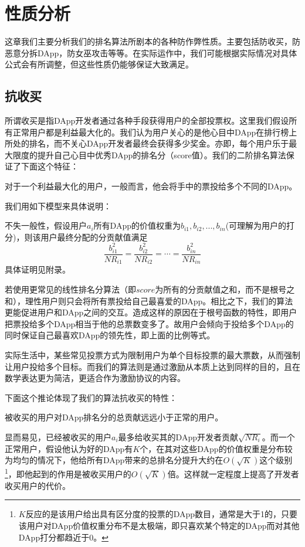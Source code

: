 \section{性质分析}
这章我们主要分析我们的排名算法所剧本的各种防作弊性质。主要包括防收买，防恶意分拆DApp，防女巫攻击等等。在实际运作中，我们可能根据实际情况对具体公式会有所调整，但这些性质仍能够保证大致满足。

\subsection{抗收买}
所谓收买是指DApp开发者通过各种手段获得用户的全部投票权。这里我们假设所有正常用户都是利益最大化的。我们认为用户关心的是他心目中DApp在排行榜上所处的排名，而不关心DApp开发者最终会获得多少奖金。亦即，每个用户乐于最大限度的提升自己心目中优秀DApp的排名分（score值）。我们的二阶排名算法保证了下面这个特征：

\begin{property}
	\label{p1}
	对于一个利益最大化的用户，一般而言，他会将手中的票投给多个不同的DApp。
\end{property}
我们用如下模型来具体说明：

不失一般性，假设用户$a_i$所有DApp的价值权重为$b_{i1},b_{i2},...,b_{in}$(可理解为用户的打分)，则该用户最终分配的分贡献值满足
$$\frac{b_{i1}^2}{NR_{i1}}=\frac{b_{i2}^2}{NR_{i2}}=\cdots=\frac{b_{in}^2}{NR_{in}}$$
具体证明见附录。

若使用更常见的线性排名分算法（即$score$为所有的分贡献值之和，而不是根号之和），理性用户则只会将所有票投给自己最喜爱的DApp。相比之下，我们的算法更能促进用户和DApp之间的交互。造成这样的原因在于根号函数的特性，即用户把票投给多个DApp相当于他的总票数变多了。故用户会倾向于投给多个DApp的同时保证自己最喜欢DApp的领先性，即上面的比例等式。

实际生活中，某些常见投票方式为限制用户为单个目标投票的最大票数，从而强制让用户投给多个目标。而我们的算法则是通过激励从本质上达到同样的目的，且在数学表达更为简洁，更适合作为激励协议的内容。

下面这个推论体现了我们的算法抗收买的特性：
\begin{corollary}
被收买的用户对DApp排名分的总贡献远远小于正常的用户。
\end{corollary}
显而易见，已经被收买的用户$a_i$最多给收买其的DApp开发者贡献$\sqrt{NR_i}$。而一个正常用户，假设他认为好的DApp有$K$个，在其对这些DApp的价值权重是分布较为均匀的情况下，他给所有DApp带来的总排名分提升大约在$O(\sqrt{K})$这个级别\footnote{$K$反应的是该用户给出具有区分度的投票的DApp数目，通常是大于1的，只要该用户对DApp价值权重分布不是太极端，即只喜欢某个特定的DApp而对其他DApp打分都趋近于0。}，即他起到的作用是被收买用户的$O(\sqrt{K})$倍。这样就一定程度上提高了开发者收买用户的代价。

